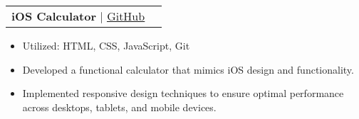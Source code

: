 \documentclass[letterpaper,11pt]{article}
\makeatletter
\newcommand{\resumeItem}[1]{
  \item\small{
    {#1 \vspace{-5pt}}
  }
}
\newcommand{\resumeProjectHeading}[2]{
    \item
    \begin{tabular*}{0.97\textwidth}{l@{\extracolsep{\fill}}r@{\hspace{-0.2in}}}
        \small#1 & #2 \\
    \end{tabular*}\vspace{-7pt}
}
\newcommand{\resumeItemListStart}{\begin{itemize}[leftmargin=0.15in, rightmargin=0.15in]}
\newcommand{\resumeItemListEnd}{\end{itemize}\vspace{-7pt}}
\makeatother
\begin{document}

        
        
        \resumeProjectHeading
            {\textbf{iOS Calculator} $|$ \href{https://github.com/juhun32/ios-calculator}{\underline{GitHub}}}{}
            \resumeItemListStart
                \resumeItem{Utilized: HTML, CSS, JavaScript, Git}
                \resumeItem{Developed a functional calculator that mimics iOS design and functionality.}
                \resumeItem{Implemented responsive design techniques to ensure optimal performance across desktops, tablets, and mobile devices.}
            \resumeItemListEnd
            
\end{document}
